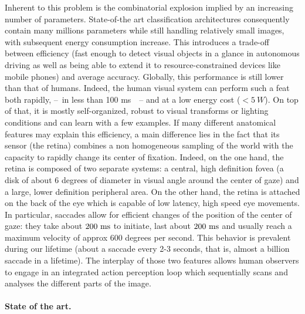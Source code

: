 Inherent to this problem is the combinatorial explosion implied by an increasing number of parameters. State-of-the art classification architectures consequently contain many millions parameters while still handling relatively small images, with subsequent energy consumption increase. This introduces a trade-off between efficiency (fast enough to detect visual objects in a glance in autonomous driving as well as being able to extend it to resource-constrained devices like mobile phones) and average accuracy. Globally, this performance is  still lower than that of humans. Indeed, the human visual system can perform such a feat both rapidly, --~in less than 100 ms~\citep{Kirchner06}~-- and at a low energy cost ($<5~W$). On top of that, it is mostly self-organized, robust to visual transforms or lighting conditions and can learn with a few examples. If many different anatomical features may explain this efficiency, a main difference lies in the fact that its sensor (the retina) combines a non homogeneous sampling of the world with the capacity to rapidly change its center of fixation. Indeed, on the one hand, the retina is composed of two separate systems: a central, high definition fovea (a disk of about 6 degrees of diameter in visual angle around the center of gaze) and a large, lower definition peripheral area. On the other hand, the retina is attached on the back of the eye which is capable of low latency, high speed eye movements.  In particular, saccades allow for efficient changes of the position of the center of gaze: they take about $200~\si{\milli\second}$ to initiate, last about $200~\si{\milli\second}$ and usually reach a maximum velocity of approx 600 degrees per second. This behavior is prevalent during our lifetime (about a saccade every 2-3 seconds, that is, almost a billion saccade in a lifetime).  The interplay of those two features allows human observers to engage in an integrated action perception loop which sequentially scans and analyses the different parts of the image.
%
\paragraph{State of the art.}


